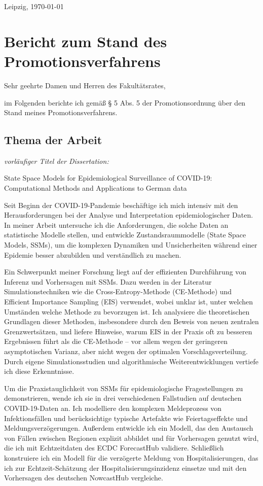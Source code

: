 \documentclass[a4paper,10pt]{article}
\begin{document}
\begin{flushright}
Leipzig, \today
\end{flushright}

\section*{Bericht zum Stand des Promotionsverfahrens}

Sehr geehrte Damen und Herren des Fakultätsrates,

im Folgenden berichte ich gemäß § 5 Abs. 5 der Promotionsordnung über den Stand meines Promotionsverfahrens.

\subsection*{Thema der Arbeit}
\textit{vorläufiger Titel der Dissertation:} 
\begin{center}State Space Models for Epidemiological Surveillance of COVID-19: Computational Methods and Applications to German data
\end{center}
\vspace{1em}
Seit Beginn der COVID-19-Pandemie beschäftige ich mich intensiv mit den Herausforderungen bei der Analyse und Interpretation epidemiologischer Daten. In meiner Arbeit untersuche ich die Anforderungen, die solche Daten an statistische Modelle stellen, und entwickle Zustandsraummodelle (State Space Models, SSMs), um die komplexen Dynamiken und Unsicherheiten während einer Epidemie besser abzubilden und verständlich zu machen.

Ein Schwerpunkt meiner Forschung liegt auf der effizienten Durchführung von Inferenz und Vorhersagen mit SSMs. Dazu werden in der Literatur Simulationstechniken wie die Cross-Entropy-Methode (CE-Methode) und Efficient Importance Sampling (EIS) verwendet, wobei unklar ist, unter welchen Umständen welche Methode zu bevorzugen ist. Ich analysiere die theoretischen Grundlagen dieser Methoden, insbesondere durch den Beweis von neuen zentralen Grenzwertsätzen, und liefere Hinweise, warum EIS in der Praxis oft zu besseren Ergebnissen führt als die CE-Methode – vor allem wegen der geringeren asymptotischen Varianz, aber nicht wegen der optimalen Vorschlagsverteilung. Durch eigene Simulationsstudien und algorithmische Weiterentwicklungen vertiefe ich diese Erkenntnisse.

Um die Praxistauglichkeit von SSMs für epidemiologische Fragestellungen zu demonstrieren, wende ich sie in drei verschiedenen Fallstudien auf deutschen COVID-19-Daten an. Ich modelliere den komplexen Meldeprozess von Infektionsfällen und berücksichtige typische Artefakte wie Feiertagseffekte und Meldungsverzögerungen. Außerdem entwickle ich ein Modell, das den Austausch von Fällen zwischen Regionen explizit abbildet und für Vorhersagen genutzt wird, die ich mit Echtzeitdaten des ECDC ForecastHub validiere. Schließlich konstruiere ich ein Modell für die verzögerte Meldung von Hospitalisierungen, das ich zur Echtzeit-Schätzung der Hospitalisierungsinzidenz einsetze und mit den Vorhersagen des deutschen NowcastHub vergleiche.
\end{document}
